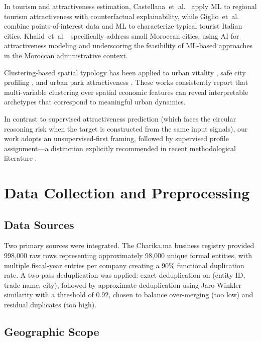 \documentclass[conference]{IEEEtran}
\begin{document}
In tourism and attractiveness estimation, Castellana~et~al.~\cite{castellana2024exploring}
apply ML to regional tourism attractiveness with counterfactual
explainability, while Giglio~et~al.~\cite{giglio2020machine}
combine points-of-interest data and ML to characterize typical
tourist Italian cities. Khalid~et~al.~\cite{khalid2023artificial}
specifically address small Moroccan cities, using AI for
attractiveness modeling and underscoring the feasibility of
ML-based approaches in the Moroccan administrative context.

Clustering-based spatial typology has been applied to urban vitality
\cite{huang2022machine}, safe city profiling \cite{kourtit2021safe},
and urban park attractiveness \cite{chen2025machine}.
These works consistently report that multi-variable clustering
over spatial economic features can reveal interpretable archetypes
that correspond to meaningful urban dynamics.

In contrast to supervised attractiveness prediction
(which faces the circular reasoning risk when the target is
constructed from the same input signals), our work adopts
an unsupervised-first framing, followed by supervised
profile assignment---a distinction explicitly recommended
in recent methodological literature \cite{agiropoulos2024exploring,sakti2024machine}.

\section{Data Collection and Preprocessing}
\label{sec:data}

\subsection{Data Sources}

Two primary sources were integrated. The Charika.ma business registry
provided 998,000 raw rows representing approximately 98,000 unique
formal entities, with multiple fiscal-year entries per company creating
a 90\% functional duplication rate. A two-pass deduplication was applied:
exact deduplication on (entity ID, trade name, city), followed by
approximate deduplication using Jaro-Winkler similarity with a threshold
of 0.92, chosen to balance over-merging (too low) and residual duplicates
(too high).

\subsection{Geographic Scope}
\end{document}
